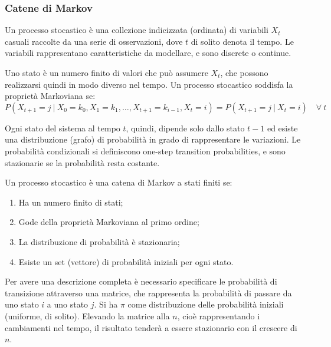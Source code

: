 \subsubsection{Catene di Markov}
Un processo stocastico è una collezione indicizzata (ordinata) di variabili $X_t$ casuali raccolte da una serie di osservazioni, dove $t$ di solito denota il tempo. Le variabili rappresentano caratteristiche da modellare, e sono discrete o continue.

Uno stato è un numero finito di valori che può assumere $X_t$, che possono realizzarsi quindi in modo diverso nel tempo. Un processo stocastico soddisfa la proprietà Markoviana se:
$$P(X_{t+1} = j\ |\ X_0 = k_0, X_1 = k_1, \dots, X_{t+1} = k_{i-1}, X_t = i) = P(X_{t+1} = j\ |\ X_t = i) \quad \forall\ t$$

Ogni stato del sistema al tempo $t$, quindi, dipende solo dallo stato $t - 1$ ed esiste una distribuzione (grafo) di probabilità in grado di rappresentare le variazioni. Le probabilità condizionali si definiscono one-step transition probabilities, e sono stazionarie se la probabilità resta costante. 

Un processo stocastico è una catena di Markov a stati finiti se:
\begin{enumerate}
	\item Ha un numero finito di stati;
	\item Gode della proprietà Markoviana al primo ordine;
	\item La distribuzione di probabilità è stazionaria;
	\item Esiste un set (vettore) di probabilità iniziali per ogni stato.
\end{enumerate}

Per avere una descrizione completa è necessario specificare le probabilità di transizione attraverso una matrice, che rappresenta la probabilità di passare da uno stato $i$ a uno stato $j$. Si ha $\pi$ come distribuzione delle probabilità iniziali (uniforme, di solito). Elevando la matrice alla $n$, cioè rappresentando i cambiamenti nel tempo, il risultato tenderà a essere stazionario con il crescere di $n$.

